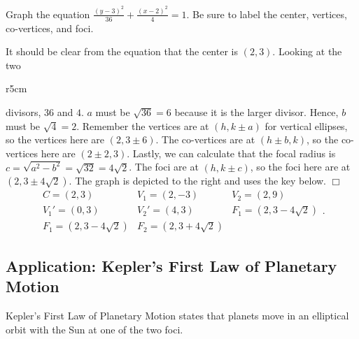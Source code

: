 \documentclass[lang=en,11pt]{elegantbook}
\begin{document}
\begin{example}
Graph the equation $\frac{(y-3)^2}{36} + \frac{(x-2)^2}{4} = 1$.  Be sure to label the center, vertices, co-vertices, and foci.
\end{example}
\begin{solution}
It should be clear from the equation that the center is $(2,3)$.  Looking at the two
\end{solution}

\begin{wrapfigure}{r}{5cm}
\end{wrapfigure}

\noindent divisors, $36$ and $4$.  $a$ must be $\sqrt{36}=6$ because it is the larger divisor.  Hence, $b$ must be $\sqrt{4}=2$.  Remember the vertices are at $(h,k \pm a)$ for vertical ellipses, so the vertices here are $(2,3 \pm 6)$.  The co-vertices are at $(h \pm b, k)$, so the co-vertices here are $(2 \pm 2,3)$.  Lastly, we can calculate that the focal radius is $c=\sqrt{a^2-b^2}=\sqrt{32} = 4\sqrt2$.  The foci are at $(h,k \pm c)$, so the foci here are at $(2,3\pm 4\sqrt2)$.  The graph is depicted to the right and uses the key below. $\Box$
$$\begin{matrix} C=(2,3) & V_1=(2,-3) & V_2=(2,9) \\ V_1'=(0,3) & V_2'=(4,3) & F_1=(2,3-4\sqrt{2}) \\ F_1=(2,3-4\sqrt{2}) & F_2=(2,3+4\sqrt{2}) \end{matrix}.$$

\subsection{Application: Kepler's First Law of Planetary Motion}
\noindent Kepler's First Law of Planetary Motion states that planets move in an elliptical orbit with the Sun at one of the two foci.
\end{document}
